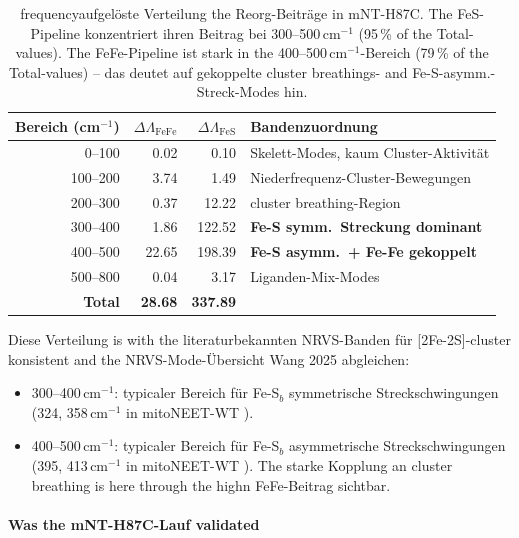 \documentclass[11pt,a4paper,twoside]{article}
\theoremstyle{remark}
\begin{document}
\begin{table}[h]
\centering
\small
\begin{tabular}{|r|r|r|l|}
\hline
\textbf{Bereich (cm$^{-1}$)} & $\Delta\Lambda_\text{FeFe}$ &
  $\Delta\Lambda_\text{FeS}$ & \textbf{Bandenzuordnung} \\
\hline
0--100   & 0.02   & 0.10    & Skelett-Modes, kaum Cluster-Aktivit\"at \\
100--200 & 3.74   & 1.49    & Niederfrequenz-Cluster-Bewegungen \\
200--300 & 0.37   & 12.22   & cluster breathing-Region \\
300--400 & 1.86   & 122.52  & \textbf{Fe-S symm.\ Streckung dominant} \\
400--500 & 22.65  & 198.39  & \textbf{Fe-S asymm.\ + Fe-Fe gekoppelt} \\
500--800 & 0.04   & 3.17    & Liganden-Mix-Modes \\
\hline
\textbf{Total} & \textbf{28.68} & \textbf{337.89} & \\
\hline
\end{tabular}
\caption{frequencyaufgel\"oste Verteilung the Reorg-Beitr\"age in
mNT-H87C. The FeS-Pipeline konzentriert ihren Beitrag bei
300--500\,cm$^{-1}$ (95\,\% of the Total-values). The FeFe-Pipeline
ist stark in the 400--500\,cm$^{-1}$-Bereich (79\,\% of the Total-values) --
das deutet auf gekoppelte cluster breathings- and Fe-S-asymm.-Streck-Modes
hin.}
\label{tab:val-mNT-frequenz}
\end{table}

Diese Verteilung is with the literaturbekannten NRVS-Banden f\"ur
[2Fe-2S]-cluster konsistent
\cite{Gee2021} and the NRVS-Mode-\"Ubersicht Wang 2025 \cite{Wang2025} abgleichen:
\begin{itemize}\setlength{\itemsep}{0pt}
  \item 300--400\,cm$^{-1}$: typicaler Bereich f\"ur Fe-S$_b$
        symmetrische Streckschwingungen (324, 358\,cm$^{-1}$ in
        mitoNEET-WT \cite{Gee2021}).
  \item 400--500\,cm$^{-1}$: typicaler Bereich f\"ur Fe-S$_b$
        asymmetrische Streckschwingungen (395, 413\,cm$^{-1}$
        in mitoNEET-WT \cite{Gee2021}). The starke Kopplung an
        cluster breathing is here through the highn FeFe-Beitrag
        sichtbar.
\end{itemize}

\paragraph{Was the mNT-H87C-Lauf validated}
\end{document}
